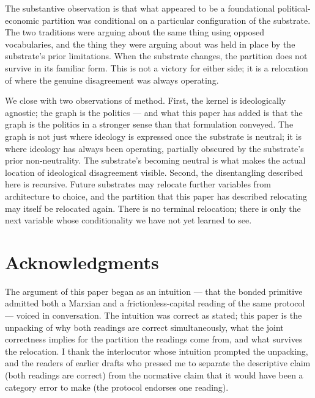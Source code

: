 \documentclass[11pt,a4paper]{article}
\theoremstyle{remark}
\begin{document}
The substantive observation is that what appeared to be a
foundational political-economic partition was conditional on a
particular configuration of the substrate. The two traditions
were arguing about the same thing using opposed vocabularies,
and the thing they were arguing about was held in place by the
substrate's prior limitations. When the substrate changes, the
partition does not survive in its familiar form. This is not a
victory for either side; it is a relocation of where the genuine
disagreement was always operating.

We close with two observations of method. First, the kernel is
ideologically agnostic; the graph is the politics --- and what
this paper has added is that the graph is the politics in a
stronger sense than that formulation conveyed.
The graph is not just where ideology is expressed once the
substrate is neutral; it is where ideology has always been
operating, partially obscured by the substrate's prior
non-neutrality. The substrate's becoming neutral is what makes
the actual location of ideological disagreement visible.
Second, the disentangling described here is recursive. Future
substrates may relocate further variables from architecture to
choice, and the partition that this paper has described
relocating may itself be relocated again. There is no terminal
relocation; there is only the next variable whose conditionality
we have not yet learned to see.

\section*{Acknowledgments}
The argument of this paper began as an intuition --- that the
bonded primitive admitted both a Marxian and a frictionless-capital
reading of the same protocol --- voiced in conversation. The
intuition was correct as stated; this paper is the unpacking of
why both readings are correct simultaneously, what the joint
correctness implies for the partition the readings come from, and
what survives the relocation. I thank the interlocutor whose
intuition prompted the unpacking, and the readers of earlier
drafts who pressed me to separate the descriptive claim (both
readings are correct) from the normative claim that it would have
been a category error to make (the protocol endorses one reading).


\end{document}
